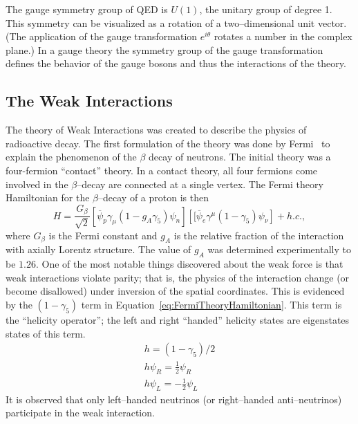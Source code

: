 The gauge symmetry group of QED is $U(1)$, the unitary group of degree 1.  This
symmetry can be visualized as a rotation of a two--dimensional unit vector. (The
application of the gauge transformation $e^{i\theta}$ rotates a number in the
complex plane.)  In a gauge theory the symmetry group of the gauge
transformation defines the behavior of the gauge bosons and thus the
interactions of the theory.  

\subsection{The Weak Interactions}
\label{sec:WeakInteractions}
The theory of Weak Interactions was created to describe the physics of
radioactive decay.  The first formulation of the theory was done by
Fermi~\cite{Fermi:1934hr} to explain the phenomenon of the $\beta$
decay of neutrons. The initial theory was a four-fermion ``contact'' theory.  In
a contact theory, all four fermions come involved in the $\beta$--decay are
connected at a single vertex.  The Fermi theory Hamiltonian for the
$\beta$--decay of a proton is then~\cite{Morii:SMandBSM}
\begin{equation}
  H = \frac{G_\beta}{\sqrt{2}}
  \left[\overline \psi_p \gamma_\mu (1 - g_A\gamma_5)\psi_n\right]
  \left[[\overline \psi_e \gamma^\mu (1 - \gamma_5) \psi_\nu\right] + h.c., 
 \label{eq:FermiTheoryHamiltonian}
\end{equation}
where $G_\beta$ is the Fermi constant and $g_A$ is the relative fraction of the
interaction with axially Lorentz structure.  The value of $g_A$ was determined
experimentally to be $1.26$.  One of the most notable things discovered about
the weak force is that weak interactions violate parity; that is, the physics of
the interaction change (or become disallowed) under inversion of the spatial
coordinates.  This is evidenced by the $(1-\gamma_5)$ term in
Equation~\ref{eq:FermiTheoryHamiltonian}.  This term is the ``helicity
operator''; the left and right ``handed'' helicity states are eigenstates states
of this term.
\begin{eqnarray}
  h = (1 - \gamma_5)/2 \nonumber \\
  h\psi_R = \frac{1}{2}\psi_R \nonumber \\ 
  h\psi_L = -\frac{1}{2}\psi_L \nonumber
\end{eqnarray}
It is observed that only left--handed neutrinos (or right--handed
anti--neutrinos)  participate in the weak
interaction.


